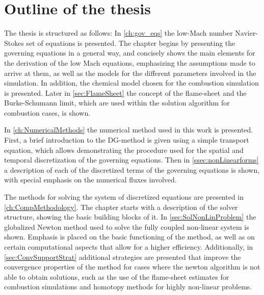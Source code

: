 \section{Outline of the thesis}

The thesis is structured as follows: In \cref{ch:gov_eqs} the low-Mach number Navier-Stokes set of equations is presented. The chapter begins by presenting the governing equations in a general way, and concisely shows the main elements for the derivation of the low Mach equations, emphasizing the assumptions made to arrive at them, as well as the models for the different parameters involved in the simulation. In addition, the chemical model chosen for the combustion simulation is presented. Later in \cref{sec:FlameSheet} the concept of the flame-sheet and the Burke-Schumann limit, which are used within the solution algorithm for combustion cases, is shown. 

In \cref{ch:NumericalMethods} the numerical method used in this work is presented. First, a brief introduction to the DG-method is given using a simple transport equation, which allows demonstrating the procedure used for the spatial and temporal discretization of the governing equations. Then in \cref{ssec:nonLinearforms} a description of each of the discretized terms of the governing equations is shown, with special emphasis on the numerical fluxes involved.

The methods for solving the system of discretized equations are presented in \cref{ch:CompMethodology}. The chapter starts with a description of the solver structure, showing the basic building blocks of it. In \cref{sec:SolNonLinProblem} the globalized Newton method used to solve the fully coupled non-linear system is shown. Emphasis is placed on the basic functioning of the method, as well as on certain computational aspects that allow for a higher efficiency. Additionally, in \cref{sec:ConvSupportStrat} additional strategies are presented that improve the convergence properties of the method for cases where the newton algorithm is not able to obtain solutions, such as the use of the flame-sheet estimates for combustion simulations and homotopy methods for highly non-linear problems.

